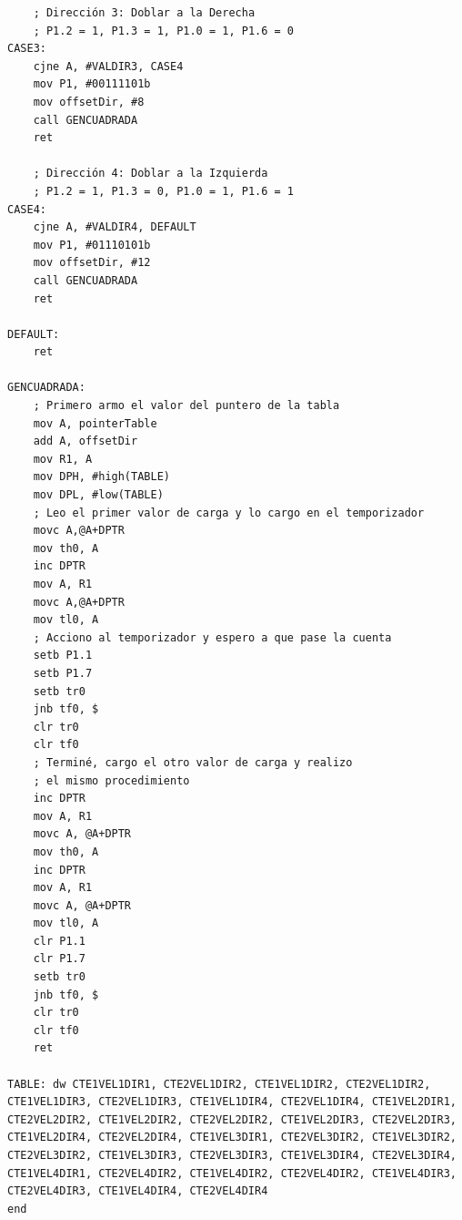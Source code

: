\documentclass[a4paper,10pt]{article}
\begin{document}
\begin{verbatim}
	; Dirección 3: Doblar a la Derecha
	; P1.2 = 1, P1.3 = 1, P1.0 = 1, P1.6 = 0
CASE3:
	cjne A, #VALDIR3, CASE4
	mov P1, #00111101b
	mov offsetDir, #8
	call GENCUADRADA
	ret

	; Dirección 4: Doblar a la Izquierda
	; P1.2 = 1, P1.3 = 0, P1.0 = 1, P1.6 = 1
CASE4:
	cjne A, #VALDIR4, DEFAULT
	mov P1, #01110101b
	mov offsetDir, #12
	call GENCUADRADA
	ret

DEFAULT:
	ret

GENCUADRADA:
	; Primero armo el valor del puntero de la tabla
	mov A, pointerTable
	add A, offsetDir
	mov R1, A
	mov DPH, #high(TABLE)
	mov DPL, #low(TABLE)
	; Leo el primer valor de carga y lo cargo en el temporizador
	movc A,@A+DPTR
	mov th0, A
	inc DPTR
	mov A, R1
	movc A,@A+DPTR
	mov tl0, A
	; Acciono al temporizador y espero a que pase la cuenta
	setb P1.1
	setb P1.7
	setb tr0
	jnb tf0, $
	clr tr0
	clr tf0
	; Terminé, cargo el otro valor de carga y realizo 
	; el mismo procedimiento
	inc DPTR
	mov A, R1
	movc A, @A+DPTR
	mov th0, A
	inc DPTR 
	mov A, R1
	movc A, @A+DPTR
	mov tl0, A
	clr P1.1 
	clr P1.7
	setb tr0
	jnb tf0, $
	clr tr0
	clr tf0
	ret

TABLE: dw CTE1VEL1DIR1, CTE2VEL1DIR2, CTE1VEL1DIR2, CTE2VEL1DIR2, 
CTE1VEL1DIR3, CTE2VEL1DIR3, CTE1VEL1DIR4, CTE2VEL1DIR4, CTE1VEL2DIR1, 
CTE2VEL2DIR2, CTE1VEL2DIR2, CTE2VEL2DIR2, CTE1VEL2DIR3, CTE2VEL2DIR3, 
CTE1VEL2DIR4, CTE2VEL2DIR4, CTE1VEL3DIR1, CTE2VEL3DIR2, CTE1VEL3DIR2, 
CTE2VEL3DIR2, CTE1VEL3DIR3, CTE2VEL3DIR3, CTE1VEL3DIR4, CTE2VEL3DIR4, 
CTE1VEL4DIR1, CTE2VEL4DIR2, CTE1VEL4DIR2, CTE2VEL4DIR2, CTE1VEL4DIR3, 
CTE2VEL4DIR3, CTE1VEL4DIR4, CTE2VEL4DIR4
end
				\end{verbatim}
\end{document}
